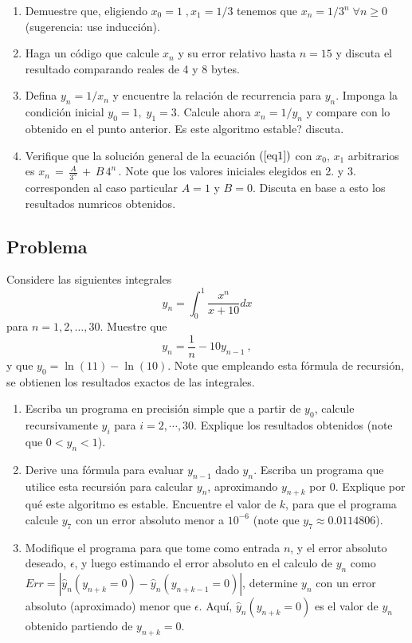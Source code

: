 \documentclass[11pt]{article}
\begin{document}
\begin{enumerate}
\def\labelenumi{\arabic{enumi}.}
\item
  Demuestre que, eligiendo \(x_0=1\;,x_1=1/3\) tenemos que
  \(x_n=1/3^n\;\forall n\geq 0\) (sugerencia: use inducci\'on).
\item
  Haga un c\'odigo que calcule \(x_n\) y su error relativo hasta \(n=15\)
  y discuta el resultado comparando reales de 4 y 8 bytes.
\item
  Defina \(y_n=1/x_n\) y encuentre la relaci\'on de recurrencia para
  \(y_n\). Imponga la condici\'on inicial \(y_0=1, \;y_1=3\). Calcule
  ahora \(x_n=1/y_n\) y compare con lo obtenido en el punto anterior. Es
  este algoritmo estable? discuta.
\item
  Verifique que la soluci\'on general de la ecuaci\'on \((\ref{eq1})\) con
  \(x_0,\,x_1\) arbitrarios es \(x_n\,=\,\frac{A}{3^n} \,+\,B\,4^n\,\).
  Note que los valores iniciales elegidos en 2. y 3. corresponden al
  caso particular \(A=1\) y \(B=0\). Discuta en base a esto los
  resultados numricos obtenidos.
\end{enumerate}

    \hypertarget{problema}{%
\subsection{Problema}\label{problema}}

Considere las siguientes integrales \[
y_n = \int_0^1 \frac{x^n}{x+10}dx
\] para \(n=1,2,\dots ,30\). Muestre que \[
y_n = \frac{1}{n} - 10 y_{n-1} \ ,
\] y que \(y_0 = \ln(11) - \ln(10)\). Note que empleando esta f\'ormula de
recursi\'on, se obtienen los resultados exactos de las integrales.

\begin{enumerate}
\def\labelenumi{\arabic{enumi}.}
\item
  Escriba un programa en precisi\'on simple que a partir de \(y_0\),
  calcule recursivamente \(y_i\) para \(i=2,\cdots ,30\). Explique los
  resultados obtenidos (note que \(0 < y_n < 1\)).
\item
  Derive una f\'ormula para evaluar \(y_{n-1}\) dado \(y_n\). Escriba un
  programa que utilice esta recursi\'on para calcular \(y_n\), aproximando
  \(y_{n+k}\) por 0. Explique por qu\'e este algoritmo es estable.
  Encuentre el valor de \(k\), para que el programa calcule \(y_{7}\)
  con un error absoluto menor a \(10^{-6}\) (note que
  \(y_7 \approx 0.0114806\)).
\item
  Modifique el programa para que tome como entrada \(n\), y el error
  absoluto deseado, \(\epsilon\), y luego estimando el error absoluto en
  el calculo de \(y_n\) como
  \(Err = |\hat{y}_n(y_{n+k}=0) - \hat{y}_n(y_{n+k-1}=0)|\), determine
  \(y_n\) con un error absoluto (aproximado) menor que \(\epsilon\).
  Aqu\'i, \(\hat{y}_n(y_{n+k}=0)\) es el valor de \(y_n\) obtenido
  partiendo de \(y_{n+k}=0\).
\end{enumerate}


    
    
    
    
\end{document}
